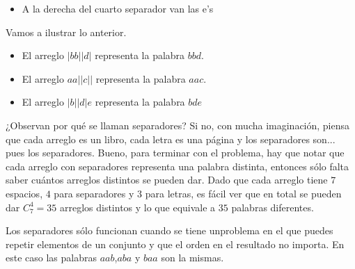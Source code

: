\begin{solucion}
\begin{itemize}
    \item A la derecha del cuarto separador van las e’s
\end{itemize}
Vamos a ilustrar lo anterior.
\begin{itemize}
    \item El arreglo $|bb||d|$ representa la palabra $bbd$.
    \item El arreglo $aa||c||$ representa la palabra $aac$.
    \item El arreglo $|b||d|e$ representa la palabra $bde$
\end{itemize}
¿Observan por qué se llaman separadores? Si no, con mucha imaginación, piensa que cada arreglo es un libro, cada letra es una página y los separadores son... pues los separadores.
Bueno, para terminar con el problema, hay que notar que cada arreglo con separadores representa una palabra distinta, entonces sólo falta saber cuántos arreglos distintos se pueden dar. Dado que cada arreglo tiene $7$ espacios, $4$ para separadores y $3$ para letras, es fácil ver que en total se pueden dar $C^4_7=35$ arreglos distintos y lo que equivale a $35$ palabras diferentes.
\end{solucion}
\begin{observacion}
Los  separadores  sólo  funcionan  cuando  se  tiene  unproblema en el que puedes repetir elementos de un conjunto y que el orden en el resultado no importa.  En este caso las palabras $aab$,$aba$ y $baa$ son la mismas.
\end{observacion}

